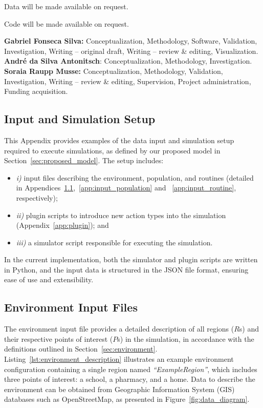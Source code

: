 \documentclass[pdflatex,sn-mathphys-num]{sn-jnl}%
\newcommand\red[1]{#1}
\theoremstyle{thmstyleone}%
\theoremstyle{thmstyletwo}%
\theoremstyle{thmstylethree}%
\begin{document}
Data will be made available on request.

Code will be made available on request.

\textbf{Gabriel Fonseca Silva:} Conceptualization, Methodology, Software, Validation, Investigation, Writing – original draft, Writing – review \& editing, Visualization. \textbf{André da Silva Antonitsch}: Conceptualization, Methodology, Investigation. \textbf{Soraia Raupp Musse:} Conceptualization, Methodology, Validation, Investigation, Writing – review \& editing, Supervision, Project administration, Funding acquisition.

\begin{appendices}

\section{Input and Simulation Setup}
\label{app:input}

This Appendix provides examples of the data input and simulation setup required to execute simulations, as defined by our proposed model in Section~\ref{sec:proposed_model}. The setup includes:
\begin{itemize}
    \item \textit{i)} input files describing the environment, population, and routines (detailed in Appendices~\ref{app:input_environment},~\ref{app:input_population} and ~\ref{app:input_routine}, respectively);
    \item \textit{ii)} plugin scripts to introduce new action types into the simulation (Appendix~\ref{app:plugin}); and
    \item \textit{iii)} a simulator script responsible for executing the simulation.
\end{itemize}
In the current implementation, both the simulator and plugin scripts are written in Python, and the input data is structured in the JSON file format, ensuring ease of use and extensibility.


\subsection{Environment Input Files}
\label{app:input_environment}
\red{The environment input file provides a detailed description of all regions ($R$s) and their respective points of interest ($P$s) in the simulation, in accordance with the definitions outlined in Section~\ref{sec:environment}. Listing~\ref{lst:environment_description} illustrates an example environment configuration containing a single region named \textit{``ExampleRegion''}, which includes three points of interest: a school, a pharmacy, and a home. Data to describe the environment can be obtained from Geographic Information System (GIS) databases such as OpenStreetMap, as presented in Figure~\ref{fig:data_diagram}.

}
\end{appendices}
\end{document}
